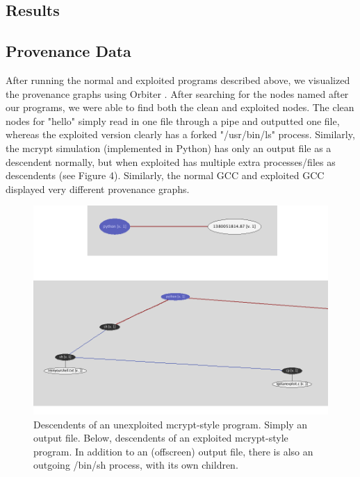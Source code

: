 \documentclass[10pt,twocolumn]{article}
\begin{document}
\subsection{Results}
\subsection{Provenance Data}
After running the normal and exploited programs described above, we visualized the provenance graphs using Orbiter \cite{orbiter}. After searching for the nodes named after our programs, we were able to find both the clean and exploited nodes. The clean nodes for "hello" simply read in one file through a pipe and outputted one file, whereas the exploited version clearly has a forked "/usr/bin/ls" process. Similarly, the mcrypt simulation (implemented in Python) has only an output file as a descendent normally, but when exploited has multiple extra processes/files as descendents (see Figure 4). Similarly, the normal GCC and exploited GCC displayed very different provenance graphs. 
\begin{figure}
  \caption{Descendents of an unexploited mcrypt-style program. Simply an output file. Below, descendents of an exploited mcrypt-style program. In addition to an (offscreen) output file, there is also an outgoing /bin/sh process, with its own children.}
  \centering
    \includegraphics[width=\textwidth]{img/mcrypt.png}
\end{figure}
\end{document}
